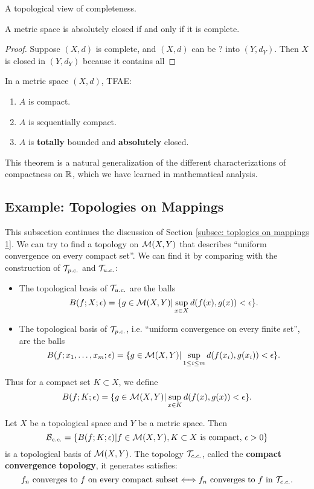 A topological view of completeness.
\begin{definition}
    
\end{definition}
\begin{proposition}
    A metric space is absolutely closed if and only if it is complete.
\end{proposition}
\begin{proof}
    Suppose $(X,d)$ is complete, and $(X,d)$ can be ? into $(Y,d_Y)$. Then $X$ is closed in $(Y,d_Y)$ because it contains all 
\end{proof}

\begin{theorem}
    In a metric space $(X,d)$, TFAE:
    \begin{enumerate}[label=(\roman*)]
        \item $A$ is compact.
        \item $A$ is sequentially compact.
        \item $A$ is \textbf{totally} bounded and \textbf{absolutely} closed.
    \end{enumerate}
\end{theorem}
\begin{remark}
    This theorem is a natural generalization of the different characterizations of compactness on $\mathbb{R}$, which we have learned in mathematical analysis.
\end{remark}

\subsection{Example: Topologies on Mappings}
\label{subsec: toplogies on mappings 2}
This subsection continues the discussion of Section \ref{subsec: toplogies on mappings 1}.
We can try to find a topology on $\mathcal{M}(X,Y)$ that describes ``uniform convergence on every compact set''.
We can find it by comparing with the construction of $\mathcal{T}_{p.c.}$ and $\mathcal{T}_{u.c.}$:
\begin{itemize}
    \item The topological basis of $\mathcal{T}_{u.c.}$ are the balls $$B(f;X;\epsilon)=\{g\in\mathcal{M}(X,Y)|\sup_{x\in X}d(f(x),g(x))<\epsilon\}.$$
    \item The topological basis of $\mathcal{T}_{p.c.}$, i.e. ``uniform convergence on every finite set'', are the balls $$B(f;x_1,\dots,x_m;\epsilon)=\{g\in\mathcal{M}(X,Y)|\sup_{1\leq i\leq m}d(f(x_i),g(x_i))<\epsilon\}.$$
\end{itemize}
Thus for a compact set $K\subset X$, we define $$B(f;K;\epsilon)=\{g\in\mathcal{M}(X,Y)|\sup_{x\in K}d(f(x),g(x))<\epsilon\}.$$
\begin{lemma}
    Let $X$ be a topological space and $Y$ be a metric space. Then $$\mathcal{B}_{c.c.}=\{B(f;K;\epsilon)|f\in\mathcal{M}(X,Y),K\subset X\text{ is compact, }\epsilon>0\}$$
    is a topological basis of $\mathcal{M}(X,Y)$. The topology $\mathcal{T}_{c.c.}$, called the \textbf{compact convergence topology}, it generates satisfies:
    $$ f_n\text{ converges to }f\text{ on every compact subset}\Longleftrightarrow f_n\text{ converges to }f\text{ in }\mathcal{T}_{c.c.}.$$
\end{lemma}

